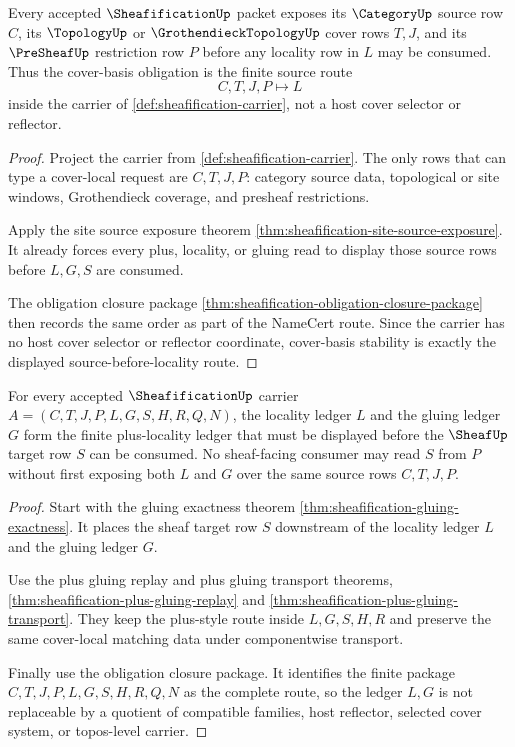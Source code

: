 \begin{theorem}
\label{thm:sheafification-cover-basis-stability}
Every accepted $\SheafificationUp$ packet exposes its $\CategoryUp$ source row $C$, its $\TopologyUp$ or $\GrothendieckTopologyUp$ cover rows $T,J$, and its $\PreSheafUp$ restriction row $P$ before any locality row in $L$ may be consumed. Thus the cover-basis obligation is the finite source route
$$
C,T,J,P \longmapsto L
$$
inside the carrier of \autoref{def:sheafification-carrier}, not a host cover selector or reflector.
\end{theorem}
\begin{proof}
Project the carrier from \autoref{def:sheafification-carrier}. The only rows that can type a cover-local request are $C,T,J,P$: category source data, topological or site windows, Grothendieck coverage, and presheaf restrictions.

Apply the site source exposure theorem \autoref{thm:sheafification-site-source-exposure}. It already forces every plus, locality, or gluing read to display those source rows before $L,G,S$ are consumed.

The obligation closure package \autoref{thm:sheafification-obligation-closure-package} then records the same order as part of the NameCert route. Since the carrier has no host cover selector or reflector coordinate, cover-basis stability is exactly the displayed source-before-locality route.
\end{proof}

\begin{theorem}
\label{thm:sheafification-plus-locality-gluing-ledger}
For every accepted $\SheafificationUp$ carrier $A=(C,T,J,P,L,G,S,H,R,Q,N)$, the locality ledger $L$ and the gluing ledger $G$ form the finite plus-locality ledger that must be displayed before the $\SheafUp$ target row $S$ can be consumed. No sheaf-facing consumer may read $S$ from $P$ without first exposing both $L$ and $G$ over the same source rows $C,T,J,P$.
\end{theorem}
\begin{proof}
Start with the gluing exactness theorem \autoref{thm:sheafification-gluing-exactness}. It places the sheaf target row $S$ downstream of the locality ledger $L$ and the gluing ledger $G$.

Use the plus gluing replay and plus gluing transport theorems, \autoref{thm:sheafification-plus-gluing-replay} and \autoref{thm:sheafification-plus-gluing-transport}. They keep the plus-style route inside $L,G,S,H,R$ and preserve the same cover-local matching data under componentwise transport.

Finally use the obligation closure package. It identifies the finite package $C,T,J,P,L,G,S,H,R,Q,N$ as the complete route, so the ledger $L,G$ is not replaceable by a quotient of compatible families, host reflector, selected cover system, or topos-level carrier.
\end{proof}

